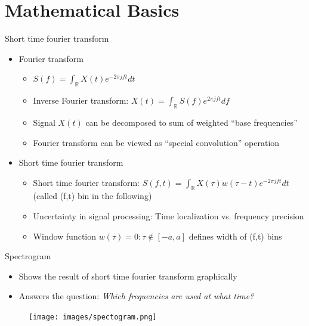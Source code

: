 \documentclass[xcolor=table,mathserif,9pt]{beamer}    %
\begin{document}
\section{Mathematical Basics}%
\label{sec:mathematical_basics}
\begin{frame}{Short time fourier transform \cite{664179}}

\begin{itemize}
	\setlength\itemsep{1em}
	\item Fourier transform 
	\begin{itemize}
		\item $S(f) = \int_{\mathbb{R}}X(t)e^{-2{\pi}jft}dt$
		\item Inverse Fourier transform: $X(t) = \int_{\mathbb{R}}S(f)e^{2{\pi}jft}df$
		\item Signal $X(t)$ can be decomposed to sum of weighted ``base frequencies''
		\item Fourier transform can be viewed as ``special convolution'' operation
	\end{itemize}
	\item Short time fourier transform
	\begin{itemize}
		\item Short time fourier transform: $S(f,t) = \int_{\mathbb{R}}X(\tau)w(\tau - t)e^{-2{\pi}jft}dt$ (called (f,t) bin in the following)
		\item Uncertainty in signal processing: Time localization vs. frequency precision \cite{DBLP:journals/corr/Nam13}
		\item Window function $w(\tau) = 0: \tau \not \in \left[-a, a \right]$ defines width of (f,t) bins 
	\end{itemize}
\end{itemize}

\end{frame}

\begin{frame}{Spectrogram}

\begin{itemize}
	\item Shows the result of short time fourier transform graphically
	\item Answers the question: \emph{Which frequencies are used at what time?}
\end{itemize}

\begin{center}
	\begin{figure}
		\texttt{[image: images/spectogram.png]}
	\end{figure}
\end{center}

\end{frame}
\end{document}
